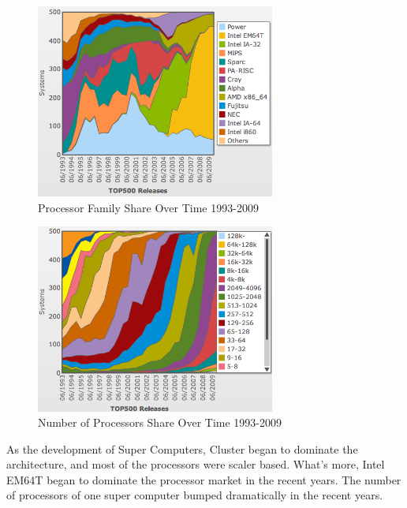 \documentclass[12pt]{article}
\begin{document}
\begin{enumerate}
\begin{description}
\begin{figure}[h!]
\end{figure}
\begin{figure}[h!]
	\begin{center}
		\includegraphics[width=0.7\textwidth, angle=0]{proc-family-share.png}
		\caption{\label{fig:proc-arch-share}Processor Family Share Over Time 1993-2009}
	\end{center}
\end{figure}
\begin{figure}[h!]
	\begin{center}
		\includegraphics[width=0.7\textwidth, angle=0]{proc-num-share.png}
		\caption{\label{fig:proc-num-share}Number of Processors Share Over Time 1993-2009}
	\end{center}
\end{figure}
As the development of Super Computers, Cluster began to dominate the architecture, and most
of the processors were scaler based. What's more, Intel EM64T began to dominate the processor
market in the recent years. The number of processors of one super computer bumped dramatically 
in the recent years.
\end{description}

\end{enumerate}
\end{document}
